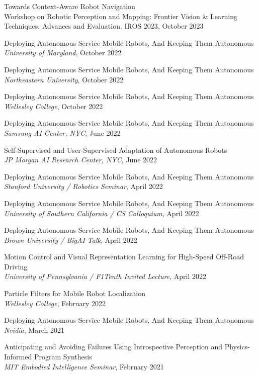 \documentclass[Times]{article}
\begin{document}
Towards Context-Aware Robot Navigation
\\
{Workshop on Robotic Perception and Mapping: Frontier Vision \& Learning Techniques: Advances and Evaluation. IROS 2023},
October 2023


Deploying Autonomous Service Mobile Robots, And Keeping Them Autonomous
\\
{\em University of Maryland}, October 2022

Deploying Autonomous Service Mobile Robots, And Keeping Them Autonomous
\\
{\em Northeastern University}, October 2022

Deploying Autonomous Service Mobile Robots, And Keeping Them Autonomous
\\
{\em Wellesley College}, October 2022

Deploying Autonomous Service Mobile Robots, And Keeping Them Autonomous
\\
{\em Samsung AI Center, NYC}, June 2022

Self-Supervised and User-Supervised Adaptation of Autonomous Robots
\\
{\em JP Morgan AI Research Center, NYC}, June 2022

Deploying Autonomous Service Mobile Robots, And Keeping Them Autonomous
\\
{\em Stanford University / Robotics Seminar}, April 2022

Deploying Autonomous Service Mobile Robots, And Keeping Them Autonomous
\\
{\em University of Southern California / CS Colloquium}, April 2022

Deploying Autonomous Service Mobile Robots, And Keeping Them Autonomous
\\
{\em Brown University / BigAI Talk}, April 2022

Motion Control and Visual Representation Learning for High-Speed Off-Road Driving
\\
{\em University of Pennsylvania / F1Tenth Invited Lecture}, April 2022

Particle Filters for Mobile Robot Localization
\\
{\em Wellesley College}, February 2022

Deploying Autonomous Service Mobile Robots, And Keeping Them Autonomous
\\
{\em Nvidia}, March 2021

Anticipating and Avoiding Failures Using Introspective Perception and Physics-Informed Program Synthesis\\
{\em MIT Embodied Intelligence Seminar}, February 2021
\end{document}
